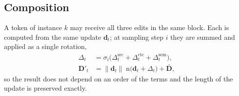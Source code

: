 \subsection{Composition}
\label{sec:composition}

A token of instance $k$ may receive all three edits in the same block. Each is computed from the same update
$\mathbf{d}_t$; at sampling step $i$ they are summed and applied as a single rotation,
\begin{align}
  \Delta_t &= \sigma_i\big(\Delta^{\mathrm{src}}_t + \Delta^{\mathrm{ctc}}_t + \Delta^{\mathrm{sem}}_t\big), \\
  \mathbf{D}'_t &= \lVert \mathbf{d}_t \rVert\;\mathrm{n}\big(\mathbf{d}_t + \Delta_t\big) + \bar{\mathbf{D}} ,
\end{align}
so the result does not depend on an order of the terms and the length of the update is preserved exactly.
